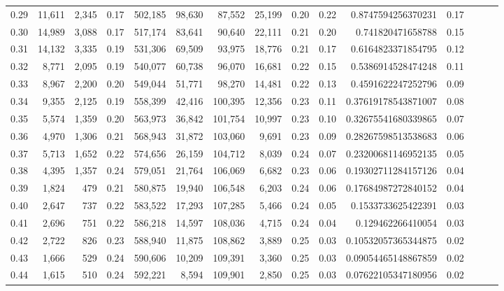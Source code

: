\begin{tabular}{rrrrrrrrrrrrrrr}
0.29 &  11,611 &  2,345 &  0.17 &  502,185 &   98,630 &   87,552 &   25,199 &  0.20 &  0.22 &      0.8747594256370231 &      0.17 \\
0.30 &  14,989 &  3,088 &  0.17 &  517,174 &   83,641 &   90,640 &   22,111 &  0.21 &  0.20 &       0.741820471658788 &      0.15 \\
0.31 &  14,132 &  3,335 &  0.19 &  531,306 &   69,509 &   93,975 &   18,776 &  0.21 &  0.17 &      0.6164823371854795 &      0.12 \\
0.32 &   8,771 &  2,095 &  0.19 &  540,077 &   60,738 &   96,070 &   16,681 &  0.22 &  0.15 &      0.5386914528474248 &      0.11 \\
0.33 &   8,967 &  2,200 &  0.20 &  549,044 &   51,771 &   98,270 &   14,481 &  0.22 &  0.13 &      0.4591622247252796 &      0.09 \\
0.34 &   9,355 &  2,125 &  0.19 &  558,399 &   42,416 &  100,395 &   12,356 &  0.23 &  0.11 &     0.37619178543871007 &      0.08 \\
0.35 &   5,574 &  1,359 &  0.20 &  563,973 &   36,842 &  101,754 &   10,997 &  0.23 &  0.10 &     0.32675541680339865 &      0.07 \\
0.36 &   4,970 &  1,306 &  0.21 &  568,943 &   31,872 &  103,060 &    9,691 &  0.23 &  0.09 &     0.28267598513538683 &      0.06 \\
0.37 &   5,713 &  1,652 &  0.22 &  574,656 &   26,159 &  104,712 &    8,039 &  0.24 &  0.07 &     0.23200681146952135 &      0.05 \\
0.38 &   4,395 &  1,357 &  0.24 &  579,051 &   21,764 &  106,069 &    6,682 &  0.23 &  0.06 &     0.19302711284157126 &      0.04 \\
0.39 &   1,824 &    479 &  0.21 &  580,875 &   19,940 &  106,548 &    6,203 &  0.24 &  0.06 &     0.17684987272840152 &      0.04 \\
0.40 &   2,647 &    737 &  0.22 &  583,522 &   17,293 &  107,285 &    5,466 &  0.24 &  0.05 &      0.1533733625422391 &      0.03 \\
0.41 &   2,696 &    751 &  0.22 &  586,218 &   14,597 &  108,036 &    4,715 &  0.24 &  0.04 &       0.129462266410054 &      0.03 \\
0.42 &   2,722 &    826 &  0.23 &  588,940 &   11,875 &  108,862 &    3,889 &  0.25 &  0.03 &     0.10532057365344875 &      0.02 \\
0.43 &   1,666 &    529 &  0.24 &  590,606 &   10,209 &  109,391 &    3,360 &  0.25 &  0.03 &     0.09054465148867859 &      0.02 \\
0.44 &   1,615 &    510 &  0.24 &  592,221 &    8,594 &  109,901 &    2,850 &  0.25 &  0.03 &     0.07622105347180956 &      0.02 \\

\end{tabular}
